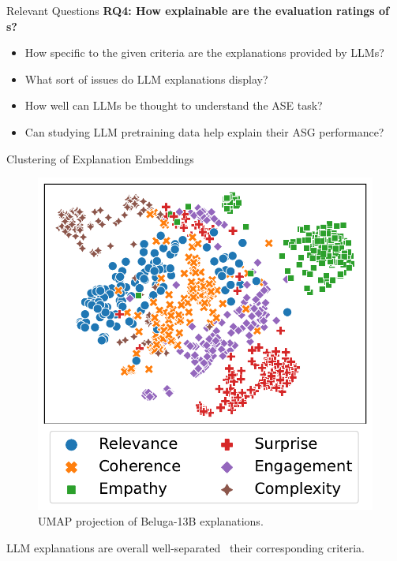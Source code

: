\begin{frame}{Relevant Questions}
    \textbf{RQ4: How explainable are the evaluation ratings of {\llm}s?}
    \begin{itemize}
        \item How specific to the given criteria are the explanations provided by LLMs?
        \item What sort of issues do LLM explanations display?
        \item How well can LLMs be thought to understand the ASE task?
        \item Can studying LLM pretraining data help explain their ASG performance?
    \end{itemize}
\end{frame}

\begin{frame}{Clustering of Explanation Embeddings}
    \begin{figure}[h!]
        \centering
        \includegraphics[width=0.45\columnwidth]{pictures/embedding_umap_beluga.pdf}
        \caption{UMAP projection of Beluga-13B explanations.}
        \label{fig:umap_explanation_beluga}
    \end{figure}
    \vspace*{-0.4cm}
    LLM explanations are overall well-separated \wrt\ their corresponding criteria.
\end{frame}

